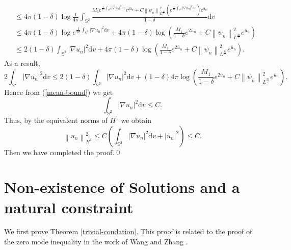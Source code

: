 \documentclass[a4paper, 12pt]{article}
\begin{document}
\begin{enumerate}[label=\roman*), leftmargin=*]
\[\begin{aligned}
		&\leq4\pi {\left( {1 - \delta } \right)}\log \frac{1}{{4\pi }}\int_{{\mathbb{S}^2}} {\frac{{M_1{e^{\frac{1}{{2\pi }}\int_{{\mathbb{S}^2}} {{{\left| {\nabla {u_n}} \right|}^2}{\text{d}}v} }}{e^{2{{\bar u}_n}}} + C\left\| {{\psi _n}} \right\|_{{L^{\frac{{32}}{7}}}}^2\left( {{e^{\frac{1}{{2\pi }}\int_{{\mathbb{S}^2}} {{{\left| {\nabla {u_n}} \right|}^2}{\text{d}}v} }}} \right){e^{{{\bar u}_n}}}}}{{1 - \delta }}{\text{d}}v} \\
		&\leq 4\pi{\left( {1 - \delta } \right)}\log {e^{\frac{1}{2\pi}\int_{{\mathbb{S}^2}} {{{\left| {\nabla u_n} \right|}^2}{\text{d}{v}}} }} + 4\pi(1-\delta)\log \left( {\frac{M_1}{{1 - \delta }}{e^{2\bar u_n}} + C\left\| \psi_n  \right\|_{L^{\frac{{32}}{7}}}^2 {{e^{\bar u_n}}} } \right)  \\
		& \leq 2{\left( {1 - \delta } \right)}\int_{{\mathbb{S}^2}} {{{\left| {\nabla u_n} \right|}^2}{\text{d}{v}}}  + 4\pi{\left( {1 - \delta } \right)}\log \left( {\frac{M_1}{{1 - \delta }}{e^{2\bar u_n}} + C\left\| \psi_n  \right\|_{L^{\frac{{32}}{7}}}^2 {{e^{\bar u_n}}}} \right).
	\end{aligned} \]
	As a result, \[2\int_{{\mathbb{S}^2}} {{{\left| {\nabla u_n} \right|}^2}{\text{d}{v}}}  \leq 2\left( {1 - \delta } \right)\int_{{\mathbb{S}^2}} {{{\left| {\nabla u_n} \right|}^2}{\text{d}{v}}}  + \left( {1 - \delta } \right)4\pi\log \left( {\frac{M_1}{{1 - \delta }}{e^{2\bar u_n}} + C\left\| \psi_n  \right\|_{L^{\frac{{32}}{7}}}^2{e^{\bar u_n}}} \right).\]
	Hence from (\ref{mean-bound}) we get
	\[\int_{{\mathbb{S}^2}} {{{\left| {\nabla u_n} \right|}^2}{\text{d}{v}}}  \leq C.\]
	Thus, by the equivalent norms of $H^1$  we obtain
	\[\left\| {{u_n}} \right\|_{{H^1}}^2 \leq C\left( {\int_{{{\mathbb{S}^2}}} {{{\left| {\nabla {u_n}} \right|}^2}} {\text{d}}v + {{\left| {{{\bar u}_n}} \right|}^2}} \right) \leq C.\]
	Then we have completed the proof.\qed
\end{enumerate}

\section{Non-existence of Solutions and a natural constraint}
We first prove Theorem \ref{trivial-condation}. This proof is related to the proof of the zero mode inequality in the work of Wang and Zhang \cite{wang2025conformal}.

\
\end{document}

